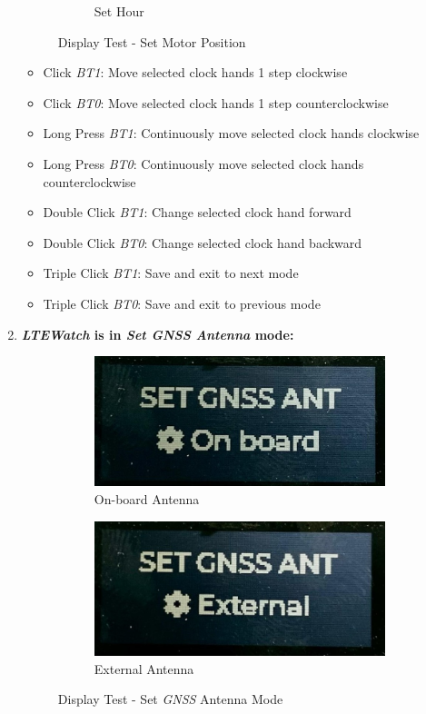\documentclass[Report.tex]{subfiles}
\begin{document}
\begin{enumerate}
\begin{figure}[H]
\begin{subfigure}{.3\textwidth}
\caption{Set Hour}
\end{subfigure}	
	\caption{Display Test - Set Motor Position}
	\label{fig:display_1}
\end{figure}
\begin{itemize}
\item Click \textit{BT1}: Move selected clock hands 1 step clockwise
\item Click \textit{BT0}: Move selected clock hands 1 step counterclockwise
\item Long Press \textit{BT1}: Continuously move selected clock hands clockwise
\item Long Press \textit{BT0}: Continuously move selected clock hands counterclockwise
\item Double Click \textit{BT1}: Change selected clock hand forward
\item Double Click \textit{BT0}: Change selected clock hand backward
\item Triple Click \textit{BT1}: Save and exit to next mode
\item Triple Click \textit{BT0}: Save and exit to previous mode
\end{itemize}
\item \textbf{\textit{LTEWatch} is in \textit{Set \textit{GNSS} Antenna} mode:}
\begin{figure}[H]
	\centering
\begin{subfigure}{.3\textwidth}
\centering
\includegraphics[width=1\textwidth]{Include/Figure/modification/display_4}
\caption{On-board Antenna}
\end{subfigure}	
\begin{subfigure}{.3\textwidth}
\centering
\includegraphics[width=1\textwidth]{Include/Figure/modification/display_5}
\caption{External Antenna}
\end{subfigure}	
	\caption{Display Test - Set \textit{GNSS} Antenna Mode}
	\label{fig:display_1}
\end{figure}


\end{enumerate}
\end{document}
